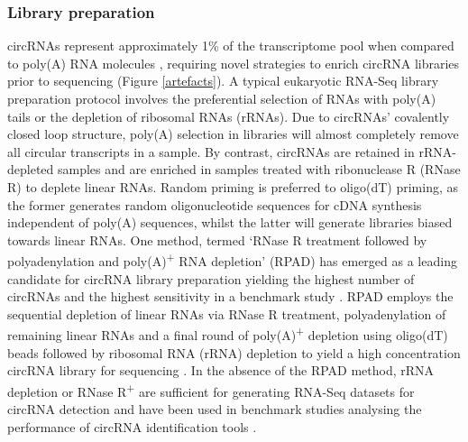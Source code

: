 \subsubsection{Library preparation}
circRNAs represent approximately 1\% of the transcriptome pool when compared to poly(A) RNA molecules \cite{Salzman2013Sep}, requiring novel strategies to enrich circRNA libraries prior to sequencing (Figure \ref{artefacts}). A typical eukaryotic RNA-Seq library preparation protocol involves the preferential selection of RNAs with poly(A) tails or the depletion of ribosomal RNAs (rRNAs). Due to circRNAs' covalently closed loop structure, poly(A) selection in libraries will almost completely remove all circular transcripts in a sample. By contrast, circRNAs are retained in rRNA-depleted samples and are enriched in samples treated with ribonuclease R (RNase R) to deplete linear RNAs. Random priming is preferred to oligo(dT) priming, as the former generates random oligonucleotide sequences for cDNA synthesis independent of poly(A) sequences, whilst the latter will generate libraries biased towards linear RNAs. One method, termed `RNase R treatment followed by polyadenylation and poly(A)\textsuperscript{+} RNA depletion' (RPAD) has emerged as a leading candidate for circRNA library preparation yielding the highest number of circRNAs and the highest sensitivity in a benchmark study \cite{Shi2022Dec}. RPAD employs the sequential depletion of linear RNAs via RNase R treatment, polyadenylation of remaining linear RNAs and a final round of poly(A)\textsuperscript{+} depletion using oligo(dT) beads followed by ribosomal RNA (rRNA) depletion to yield a high concentration circRNA library for sequencing \cite{Panda2017Jul, Pandey2019Feb}. In the absence of the RPAD method, rRNA depletion or RNase R\textsuperscript{+} are sufficient for generating RNA-Seq datasets for circRNA detection and have been used in benchmark studies analysing the performance of circRNA identification tools \cite{DCC}.

